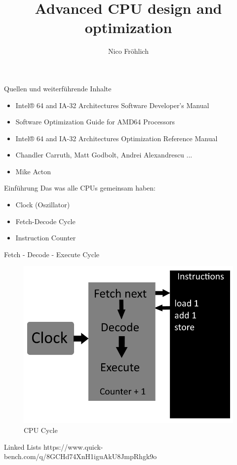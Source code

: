 \documentclass[11pt]{beamer}
\author{Nico Fröhlich}
\title{Advanced CPU design and optimization}
\institute{Troblecodings}
\begin{document}
\begin{frame}
    \titlepage
\end{frame}

\begin{frame}{Quellen und weiterführende Inhalte}
    \begin{itemize}
        \item Intel® 64 and IA-32 Architectures Software Developer’s Manual
        \item Software Optimization Guide for AMD64 Processors
        \item Intel® 64 and IA-32 Architectures Optimization Reference Manual
        \item Chandler Carruth, Matt Godbolt, Andrei Alexandrescu ...
        \item Mike Acton
    \end{itemize}
\end{frame}

\begin{frame}{Einführung}
Das was alle CPUs gemeinsam haben:
    \begin{itemize}
        \item Clock (Oszillator)
        \item Fetch-Decode Cycle
        \item Instruction Counter
    \end{itemize}
\end{frame}

\begin{frame}{Fetch - Decode - Execute Cycle}
\begin{figure}[hbtp]
\centering
\includegraphics[scale=.4]{cpucycle.png}
\caption{CPU Cycle}
\end{figure}
\end{frame}

\begin{frame}{Linked Lists}
https://www.quick-bench.com/q/8GCHd74XnH1iguAkU8JmpRhgk9o
\end{frame}
\end{document}
